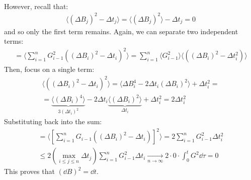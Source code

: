 \documentclass[../template.tex]{subfiles}
\begin{document}
\begin{example}[Integral in $\dd{B}^2$]
\begin{align*}
    \end{align*} 
    However, recall that:
    \begin{align*}
        \langle (\Delta B_j)^2 - \Delta t_j \rangle = \langle (\Delta B_j)^2 \rangle - \Delta t_j = 0
    \end{align*}
    and so only the first term remains. Again, we can separate two independent terms:
    \begin{align*}
        = \langle \sum_{i=1}^n G_{i-1}^2 ((\Delta B_i)^2 - \Delta t_i)^2 \rangle = \sum_{i=1}^n \langle G_{i-1}^2 \rangle \langle ((\Delta B_i)^2 - \Delta t_i^2) \rangle
    \end{align*}
    Then, focus on a single term:
    \begin{align*}
        \langle ((\Delta B_i)^2 - \Delta t_i)^2 \rangle = \langle  \Delta B_i^4 - 2 \Delta t_i (\Delta B_i)^2 \rangle + \Delta t_i^2 = \\
        = \underbrace{\langle (\Delta B_i)^4 \rangle}_{3(\Delta t_i)^2}  - 2 \Delta t_i \underbrace{\langle (\Delta B_i)^2 \rangle}_{\Delta t_i}  + \Delta t_i^2 = 2 \Delta t_i^2 
    \end{align*}
    Substituting back into the sum:
    \begin{align*}
        = \langle \left[\sum_{i=1}^n G_{i-1} ((\Delta B_i)^2 - \Delta t_i)\right]^2 \rangle = 2 \sum_{i=1}^n G_{i-1}^2 \Delta t_i^2 \\
        \leq 2 \left(\max_{i\leq j \leq n} \Delta t_j\right) \sum_{i=1}^n G_{i-1}^2 \Delta t_i  \xrightarrow[n \to \infty]{}  2 \cdot 0 \cdot \int_0^t G^2 \dd{\tau} = 0
    \end{align*}
    This proves that $(\dd{B})^2 = \dd{t}$. 
\end{example}
\end{document}
